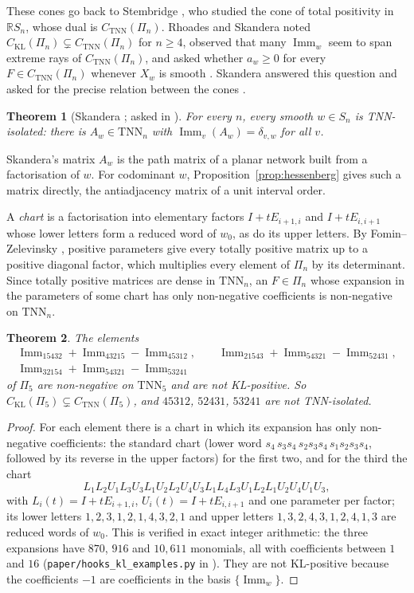 \documentclass[11pt]{amsart}
\newtheorem{theorem}{Theorem}[section]
\theoremstyle{definition}
\theoremstyle{remark}
\newcommand{\R}{\mathbb{R}}
\newcommand{\Imm}{\operatorname{Imm}}
\newcommand{\TNN}{\mathrm{TNN}}
\newcommand{\CKL}{C_{\mathrm{KL}}}
\newcommand{\CTNN}{C_{\mathrm{TNN}}}
\begin{document}
These cones go back to Stembridge \cite[\S5]{Ste92}, who studied the cone of total positivity in $\R S_n$, whose dual is $\CTNN(\Pi_n)$. Rhoades and Skandera \cite[\S7]{RS06} noted $\CKL(\Pi_n)\subsetneq\CTNN(\Pi_n)$ for $n\ge4$, observed that many $\Imm_w$ seem to span extreme rays of $\CTNN(\Pi_n)$, and asked whether $a_w\ge0$ for every $F\in\CTNN(\Pi_n)$ whenever $X_w$ is smooth \cite[Question~7.1]{RS06}. Skandera answered this question \cite{Ska08} and asked for the precise relation between the cones \cite[Problem~5.8]{Ska08}.

\begin{theorem}[Skandera {\cite[Thms.~5.4, 5.5]{Ska08}}; asked in {\cite[Question~7.1]{RS06}}]\label{thm:skandera}
For every $n$, every smooth $w\in S_n$ is TNN-isolated: there is $A_w\in\TNN_n$ with $\Imm_v(A_w)=\delta_{v,w}$ for all $v$.
\end{theorem}

Skandera's matrix $A_w$ is the path matrix of a planar network built from a factorisation of $w$. For codominant $w$, Proposition~\ref{prop:hessenberg} gives such a matrix directly, the antiadjacency matrix of a unit interval order.

A \emph{chart} is a factorisation into elementary factors $I+tE_{i+1,i}$ and $I+tE_{i,i+1}$ whose lower letters form a reduced word of $w_0$, as do its upper letters. By Fomin--Zelevinsky \cite{FZ}, positive parameters give every totally positive matrix up to a positive diagonal factor, which multiplies every element of $\Pi_n$ by its determinant. Since totally positive matrices are dense in $\TNN_n$, an $F\in\Pi_n$ whose expansion in the parameters of some chart has only non-negative coefficients is non-negative on $\TNN_n$.

\begin{theorem}\label{thm:beyond}
The elements
\begin{gather*}
\Imm_{15432}+\Imm_{43215}-\Imm_{45312},\qquad \Imm_{21543}+\Imm_{54321}-\Imm_{52431},\\ \Imm_{32154}+\Imm_{54321}-\Imm_{53241}
\end{gather*}
of $\Pi_5$ are non-negative on $\TNN_5$ and are not KL-positive. So $\CKL(\Pi_5)\subsetneq\CTNN(\Pi_5)$, and $45312$, $52431$, $53241$ are not TNN-isolated.
\end{theorem}

\begin{proof}
For each element there is a chart in which its expansion has only non-negative coefficients: the standard chart (lower word $s_4\,s_3s_4\,s_2s_3s_4\,s_1s_2s_3s_4$, followed by its reverse in the upper factors) for the first two, and for the third the chart
\[
L_1L_2U_1L_3U_3L_1U_2L_2U_4U_3L_1L_4L_3U_1L_2L_1U_2U_4U_1U_3,
\]
with $L_i(t)=I+tE_{i+1,i}$, $U_i(t)=I+tE_{i,i+1}$ and one parameter per factor; its lower letters $1,2,3,1,2,1,4,3,2,1$ and upper letters $1,3,2,4,3,1,2,4,1,3$ are reduced words of $w_0$. This is verified in exact integer arithmetic: the three expansions have $870$, $916$ and $10{,}611$ monomials, all with coefficients between $1$ and $16$ (\texttt{paper/hooks\_kl\_examples.py} in \cite{McNcode}). They are not KL-positive because the coefficients $-1$ are coefficients in the basis $\{\Imm_w\}$.
\end{proof}
\end{document}
